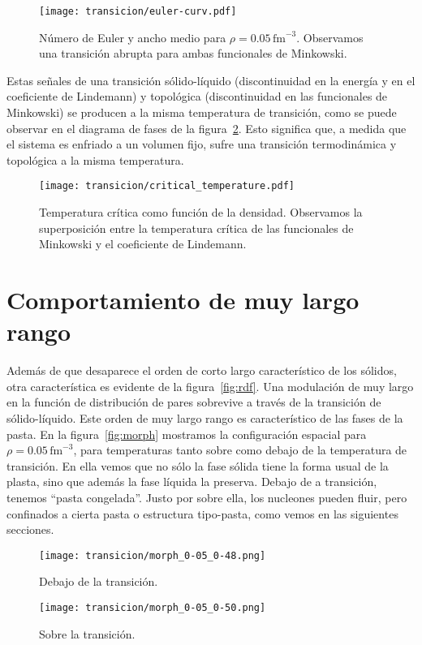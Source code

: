 \begin{figure}%
  \centering \texttt{[image: transicion/euler-curv.pdf]}
  \caption{Número de Euler y ancho medio para $\rho=0.05\,\text{fm}^{-3}$.
    Observamos una transición abrupta para ambas funcionales de Minkowski.}
  \label{fig:euler-curv}
\end{figure}

Estas señales de una transición sólido-líquido (discontinuidad en la energía y en el coeficiente de Lindemann) y topológica (discontinuidad en las funcionales de Minkowski) se producen a la misma temperatura de transición, como se puede observar en el diagrama de fases de la figura~\ref{fig:critical_temperature}.
Esto significa que, a medida que el sistema es enfriado a un volumen fijo, sufre una transición termodinámica y topológica a la misma temperatura.

\begin{figure}
  \centering
  \texttt{[image: transicion/critical\_temperature.pdf]}
  \caption{Temperatura crítica como función de la densidad.
    Observamos la superposición entre la temperatura crítica de las funcionales de Minkowski y el coeficiente de Lindemann.}
  \label{fig:critical_temperature}
\end{figure}


\section{Comportamiento de muy largo rango}\label{very_long}
Además de que desaparece el orden de corto largo característico de los sólidos, otra característica es evidente de la figura~\ref{fig:rdf}.
Una modulación de muy largo en la función de distribución de pares sobrevive a través de la transición de sólido-líquido.
Este orden de muy largo rango es característico de las fases de la pasta.
En la figura~\ref{fig:morph} mostramos la configuración espacial para $\rho=0.05\,\text{fm}^{-3}$, para temperaturas tanto sobre como debajo de la temperatura de transición.
En ella vemos que no sólo la fase sólida tiene la forma usual de la plasta, sino que además la fase líquida la preserva.
Debajo de a transición, tenemos ``pasta congelada''.
Justo por sobre ella, los nucleones pueden fluir, pero confinados a cierta pasta o estructura tipo-pasta, como vemos en las siguientes secciones.

\begin{figure*}[floatfix]%
  \centering
  \begin{subfigure}[h!]{0.48\columnwidth}
    \texttt{[image: transicion/morph\_0-05\_0-48.png]}
    \caption*{Debajo de la transición.}
  \end{subfigure}
  \begin{subfigure}[h!]{0.48\columnwidth}
    \texttt{[image: transicion/morph\_0-05\_0-50.png]}
    \caption*{Sobre la transición.}
  \end{subfigure}
  \caption{Distribución espacial para $\rho=0.05\,\text{fm}^{-3}$, tanto sobre como debajo de la temperatura de transición.
    Las estructuras son similares, pero mucho más desordenadas sobre la transición.}
  \label{fig:morph}
\end{figure*}

